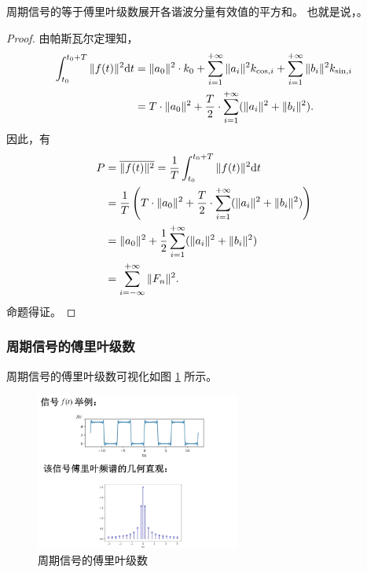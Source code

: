 \begin{corollary}[帕斯瓦尔定理的推论]
    周期信号的等于傅里叶级数展开各谐波分量有效值的平方和。
    也就是说，。
\end{corollary}

\begin{proof}
    由帕斯瓦尔定理知，
    \begin{align*}
        \int_{t_0}^{t_0 + T}\|f(t)\|^2\mathrm{d}t & = \|a_0\|^2\cdot k_0
            + \sum_{i = 1}^{+\infty}\|a_i\|^2k_{\cos, i}
            + \sum_{i = 1}^{+\infty}\|b_i\|^2k_{\sin, i} \\
        & = T \cdot \|a_0\|^2 + \frac{T}{2}\cdot \sum_{i = 1}^{+\infty}(\|a_i\|^2 + \|b_i\|^2).
    \end{align*}
    因此，有
    \begin{align*}
        P & = \overline{\|f(t)\|^2} = \frac{1}{T}\int_{t_0}^{t_0 + T}\|f(t)\|^2\mathrm{d}t \\
        & = \frac{1}{T}\left(T \cdot \|a_0\|^2 + \frac{T}{2}\cdot \sum_{i = 1}^{+\infty}(\|a_i\|^2 + \|b_i\|^2)\right) \\
        & = \|a_0\|^2 + \frac{1}{2}\sum_{i = 1}^{+\infty}(\|a_i\|^2 + \|b_i\|^2) \\
        & = \sum_{i = -\infty}^{+\infty}\|F_n\|^2.
    \end{align*}
    命题得证。
\end{proof}

\subsubsection{周期信号的傅里叶级数}

\begin{definition}
    

    周期信号的傅里叶级数可视化如图 \ref{fig:periodic-signal-fourier-series} 所示。
    \begin{figure}[H]
        \centering
        \includegraphics[width = 0.6\textwidth]{chap2/img/periodic-signal-fourier-series.png}
        \caption{周期信号的傅里叶级数}
        \label{fig:periodic-signal-fourier-series}
    \end{figure}
\end{definition}

